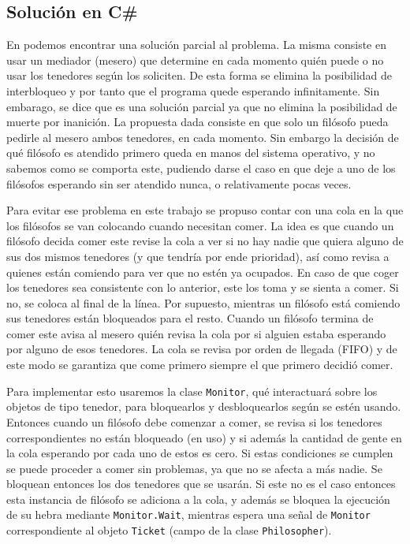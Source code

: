 \documentclass[12pt]{amsart}
\theoremstyle{definition}
\numberwithin{equation}{section}
\newcommand{\csl}[1]{\texttt{#1}}
\begin{document}
\subsection{Soluci\'on en C\#}

En \cite[Ep\'igrafe 17.7.2.2]{katrip} podemos encontrar una soluci\'on parcial al problema. La misma consiste en usar un mediador (mesero) que determine en cada momento qui\'en puede o no usar los tenedores seg\'un los soliciten. De esta forma se elimina la posibilidad de interbloqueo y por tanto que el programa quede esperando infinitamente. Sin embarago, se dice que es una soluci\'on parcial ya que no elimina la posibilidad de muerte por inanici\'on. La propuesta dada consiste en que solo un fil\'osofo pueda pedirle al mesero ambos tenedores, en cada momento. Sin embargo la decisi\'on de qu\'e fil\'osofo es atendido primero queda en manos del sistema operativo, y no sabemos como se comporta este, pudiendo darse el caso en que deje a uno de los fil\'osofos esperando sin ser atendido nunca, o relativamente pocas veces.

Para evitar ese problema en este trabajo se propuso contar con una cola en la que los fil\'osofos se van colocando cuando necesitan comer. La idea es que cuando un fil\'osofo decida comer este revise la cola a ver si no hay nadie que quiera alguno de sus dos mismos tenedores (y que tendr\'ia por ende prioridad), as\'i como revisa a quienes est\'an comiendo para ver que no est\'en ya ocupados. En caso de que coger los tenedores sea consistente con lo anterior, este los toma y se sienta a comer. Si no, se coloca al final de la l\'inea. Por supuesto, mientras un fil\'osofo est\'a comiendo sus tenedores est\'an bloqueados para el resto. Cuando un fil\'osofo termina de comer este avisa al mesero qui\'en revisa la cola por si alguien estaba esperando por alguno de esos tenedores. La cola se revisa por orden de llegada (FIFO) y de este modo se garantiza que come primero siempre el que primero decidi\'o comer.\

Para implementar esto usaremos la clase \csl{Monitor}, qu\'e interactuar\'a sobre los objetos de tipo tenedor, para bloquearlos y desbloquearlos seg\'un se est\'en usando. Entonces cuando un fil\'osofo debe comenzar a comer, se revisa si los tenedores correspondientes no est\'an bloqueado (en uso) y si adem\'as la cantidad de gente en la cola esperando por cada uno de estos es cero. Si estas condiciones se cumplen se puede proceder a comer sin problemas, ya que no se afecta a m\'as nadie. Se bloquean entonces los dos tenedores que se usar\'an. Si este no es el caso entonces esta instancia de fil\'osofo se adiciona a la cola, y adem\'as se bloquea la ejecuci\'on de su hebra mediante \csl{Monitor.Wait}, mientras espera una se\~nal de \csl{Monitor} correspondiente al objeto \csl{Ticket} (campo de la clase \csl{Philosopher}).
\end{document}
